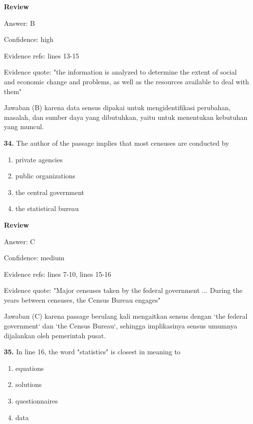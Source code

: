 \documentclass[12pt]{article}
\begin{document}
\par
\begingroup
\setlength{\parskip}{0pt}
\setlength{\parindent}{0pt}
\textbf{Review}\par
Answer: B\par
Confidence: high\par
Evidence refs: lines 13-15\par
Evidence quote: "the information is analyzed to determine the extent of social and economic change and problems, as well as the resources available to deal with them"\par
Jawaban (B) karena data sensus dipakai untuk mengidentifikasi perubahan, masalah, dan sumber daya yang dibutuhkan, yaitu untuk menentukan kebutuhan yang muncul.\par
\endgroup
\par
\vspace{0.25\baselineskip}
\noindent\textbf{34.} The author of the passage implies that most censuses are conducted by
\begin{enumerate}[label=(\Alph*),leftmargin=*,itemsep=0.2em]
\item private agencies
\item public organizations
\item the central government
\item the statistical bureau
\end{enumerate}
\par
\begingroup
\setlength{\parskip}{0pt}
\setlength{\parindent}{0pt}
\textbf{Review}\par
Answer: C\par
Confidence: medium\par
Evidence refs: lines 7-10, lines 15-16\par
Evidence quote: "Major censuses taken by the federal government ... During the years between censuses, the Census Bureau engages"\par
Jawaban (C) karena passage berulang kali mengaitkan sensus dengan `the federal government` dan `the Census Bureau`, sehingga implikasinya sensus umumnya dijalankan oleh pemerintah pusat.\par
\endgroup
\par
\vspace{0.25\baselineskip}
\noindent\textbf{35.} In line 16, the word "statistics" is closest in meaning to
\begin{enumerate}[label=(\Alph*),leftmargin=*,itemsep=0.2em]
\item equations
\item solutions
\item questionnaires
\item data
\end{enumerate}
\end{document}
